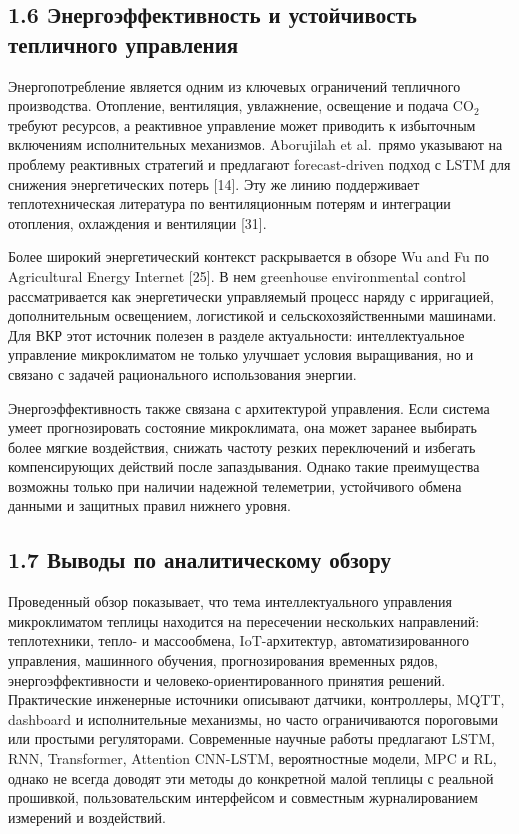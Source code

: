 \documentclass[a4paper,14pt]{extarticle}
\begin{document}
\subsection{1.6 Энергоэффективность и устойчивость тепличного
управления}\label{ux44dux43dux435ux440ux433ux43eux44dux444ux444ux435ux43aux442ux438ux432ux43dux43eux441ux442ux44c-ux438-ux443ux441ux442ux43eux439ux447ux438ux432ux43eux441ux442ux44c-ux442ux435ux43fux43bux438ux447ux43dux43eux433ux43e-ux443ux43fux440ux430ux432ux43bux435ux43dux438ux44f}

Энергопотребление является одним из ключевых ограничений тепличного
производства. Отопление, вентиляция, увлажнение, освещение и подача
CO\(_2\) требуют ресурсов, а реактивное управление может приводить к
избыточным включениям исполнительных механизмов. Aborujilah et al.~прямо
указывают на проблему реактивных стратегий и предлагают forecast-driven
подход с LSTM для снижения энергетических потерь {[}14{]}. Эту же линию
поддерживает теплотехническая литература по вентиляционным потерям и
интеграции отопления, охлаждения и вентиляции {[}31{]}.

Более широкий энергетический контекст раскрывается в обзоре Wu and Fu по
Agricultural Energy Internet {[}25{]}. В нем greenhouse environmental
control рассматривается как энергетически управляемый процесс наряду с
ирригацией, дополнительным освещением, логистикой и
сельскохозяйственными машинами. Для ВКР этот источник полезен в разделе
актуальности: интеллектуальное управление микроклиматом не только
улучшает условия выращивания, но и связано с задачей рационального
использования энергии.

Энергоэффективность также связана с архитектурой управления. Если
система умеет прогнозировать состояние микроклимата, она может заранее
выбирать более мягкие воздействия, снижать частоту резких переключений и
избегать компенсирующих действий после запаздывания. Однако такие
преимущества возможны только при наличии надежной телеметрии,
устойчивого обмена данными и защитных правил нижнего уровня.

\subsection{1.7 Выводы по аналитическому
обзору}\label{ux432ux44bux432ux43eux434ux44b-ux43fux43e-ux430ux43dux430ux43bux438ux442ux438ux447ux435ux441ux43aux43eux43cux443-ux43eux431ux437ux43eux440ux443}

Проведенный обзор показывает, что тема интеллектуального управления
микроклиматом теплицы находится на пересечении нескольких направлений:
теплотехники, тепло- и массообмена, IoT-архитектур, автоматизированного
управления, машинного обучения, прогнозирования временных рядов,
энергоэффективности и человеко-ориентированного принятия решений.
Практические инженерные источники описывают датчики, контроллеры, MQTT,
dashboard и исполнительные механизмы, но часто ограничиваются пороговыми
или простыми регуляторами. Современные научные работы предлагают LSTM,
RNN, Transformer, Attention CNN-LSTM, вероятностные модели, MPC и RL,
однако не всегда доводят эти методы до конкретной малой теплицы с
реальной прошивкой, пользовательским интерфейсом и совместным
журналированием измерений и воздействий.
\end{document}

